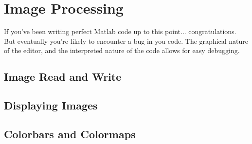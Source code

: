 
\pagebreak
\section{Image Processing}
If you've been writing perfect Matlab code up to this point... congratulations.
 But eventually you're likely to encounter a bug in you code.
 The graphical nature of the editor, and the interpreted nature of the code allows for easy debugging.

\subsection{Image Read and Write}

\begin{quote}

\end{quote}

\pagebreak
\subsection{Displaying Images}

\begin{quote}
 
\end{quote}

\pagebreak
\subsection{Colorbars and Colormaps}

\begin{quote}
 
\end{quote}
